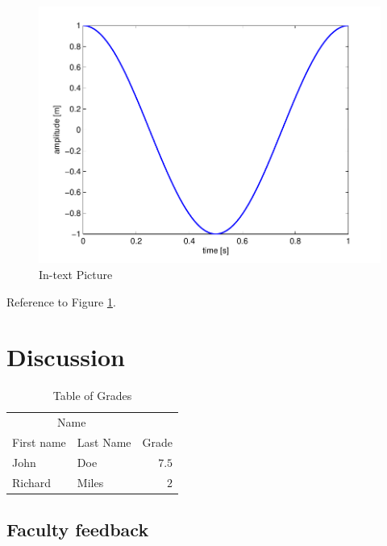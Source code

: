 \documentclass[fleqn,10pt]{SelfArx}\usepackage[]{graphicx}\usepackage[]{color}
\begin{document}
\begin{figure}[ht]\centering
\includegraphics[width=\linewidth]{results}
\caption{In-text Picture}
\label{fig:results}
\end{figure}

Reference to Figure \ref{fig:results}.


\section{Discussion}

\lipsum[1] %

\lipsum[1] %

\begin{table}[hbt]
\caption{Table of Grades}
\centering
\begin{tabular}{llr}
\toprule
\multicolumn{2}{c}{Name} \\
\cmidrule(r){1-2}
First name & Last Name & Grade \\
\midrule
John & Doe & $7.5$ \\
Richard & Miles & $2$ \\
\bottomrule
\end{tabular}
\label{tab:label}
\end{table}

\subsection{Faculty feedback}
\lipsum[1] %
\end{document}

